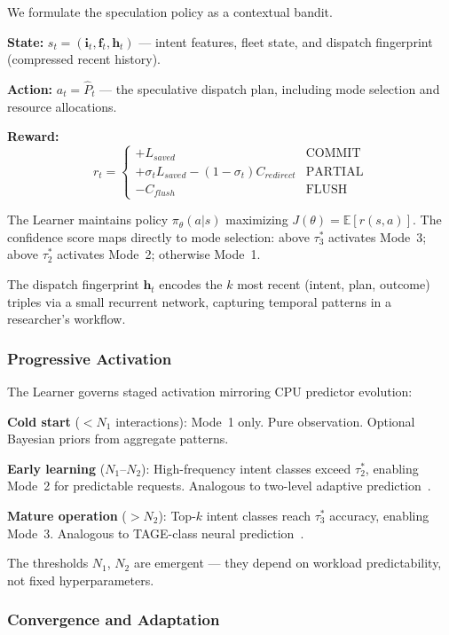 \documentclass[conference,10pt]{IEEEtran}
\begin{document}
We formulate the speculation policy as a contextual bandit.

\textbf{State:} $s_t = (\mathbf{i}_t, \mathbf{f}_t, \mathbf{h}_t)$ --- intent features, fleet state, and dispatch fingerprint (compressed recent history).

\textbf{Action:} $a_t = \hat{P}_t$ --- the speculative dispatch plan, including mode selection and resource allocations.

\textbf{Reward:}
\begin{equation}
r_t = \begin{cases}
+L_{saved} & \text{COMMIT} \\
+\sigma_t L_{saved} - (1-\sigma_t)C_{redirect} & \text{PARTIAL} \\
-C_{flush} & \text{FLUSH}
\end{cases}
\end{equation}

The Learner maintains policy $\pi_\theta(a|s)$ maximizing $J(\theta) = \mathbb{E}[r(s,a)]$.
The confidence score maps directly to mode selection: above $\tau_3^*$ activates Mode~3; above $\tau_2^*$ activates Mode~2; otherwise Mode~1.

The dispatch fingerprint $\mathbf{h}_t$ encodes the $k$ most recent (intent, plan, outcome) triples via a small recurrent network, capturing temporal patterns in a researcher's workflow.

\subsubsection{Progressive Activation}

The Learner governs staged activation mirroring CPU predictor evolution:

\textbf{Cold start} ($< N_1$ interactions): Mode~1 only. Pure observation. Optional Bayesian priors from aggregate patterns.

\textbf{Early learning} ($N_1$--$N_2$): High-frequency intent classes exceed $\tau_2^*$, enabling Mode~2 for predictable requests.
Analogous to two-level adaptive prediction~\cite{yeh1991two}.

\textbf{Mature operation} ($> N_2$): Top-$k$ intent classes reach $\tau_3^*$ accuracy, enabling Mode~3.
Analogous to TAGE-class neural prediction~\cite{seznec2011tage}.

The thresholds $N_1$, $N_2$ are emergent --- they depend on workload predictability, not fixed hyperparameters.

\subsubsection{Convergence and Adaptation}
\end{document}

